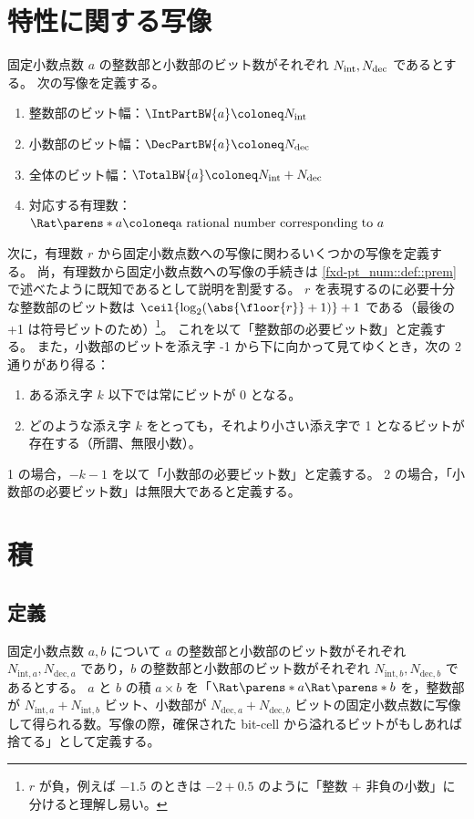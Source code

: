     \section{特性に関する写像}
        固定小数点数 $a$ の整数部と小数部のビット数がそれぞれ ${N_\mathrm{int}}, {N_\mathrm{dec}}$ であるとする。
        次の写像を定義する。
        \begin{enumerate}
            \item 整数部のビット幅：$\IntPartBW{a} \coloneq \Ni$
            \item 小数部のビット幅：$\DecPartBW{a} \coloneq \Nd$
            \item 全体のビット幅：$\TotalBW{a} \coloneq \Ni + \Nd$
            \item 対応する有理数：$\Rat\parens*{a} \coloneq \text{a rational number corresponding to }a$
        \end{enumerate}
        次に，有理数 $r$ から固定小数点数への写像に関わるいくつかの写像を定義する。
        尚，有理数から固定小数点数への写像の手続きは \ref{fxd-pt_num::def::prem} で述べたように既知であるとして説明を割愛する。
        $r$ を表現するのに必要十分な整数部のビット数は $\ceil{\log_2(\abs{\floor{r}}+1)}+1$ である（最後の +1 は符号ビットのため）\footnote{$r$ が負，例えば $-1.5$ のときは $-2+0.5$ のように「整数 + 非負の小数」に分けると理解し易い。}。
        これを以て「整数部の必要ビット数」と定義する。
        また，小数部のビットを添え字 -1 から下に向かって見てゆくとき，次の 2 通りがあり得る：
        \begin{enumerate}
            \item ある添え字 $k$ 以下では常にビットが 0 となる。
            \item どのような添え字 $k$ をとっても，それより小さい添え字で 1 となるビットが存在する（所謂、無限小数）。
        \end{enumerate}
        1 の場合，$-k-1$ を以て「小数部の必要ビット数」と定義する。
        2 の場合，「小数部の必要ビット数」は無限大であると定義する。
    \section{積}
        \newcommand{\Nia}{{N_{\mathrm{int},a}}}
        \newcommand{\Nda}{{N_{\mathrm{dec},a}}}
        \newcommand{\Nib}{{N_{\mathrm{int},b}}}
        \newcommand{\Ndb}{{N_{\mathrm{dec},b}}}
        \subsection{定義}
            固定小数点数 $a, b$ について $a$ の整数部と小数部のビット数がそれぞれ $\Nia, \Nda$ であり，$b$ の整数部と小数部のビット数がそれぞれ $\Nib, \Ndb$ であるとする。
            $a$ と $b$ の積 $a\times b$ を「$\Rat\parens*{a}\Rat\parens*{b}$ を，整数部が $\Nia+\Nib$ ビット、小数部が $\Nda+\Ndb$ ビットの固定小数点数に写像して得られる数。写像の際，確保された bit-cell から溢れるビットがもしあれば捨てる」として定義する。
            \par
